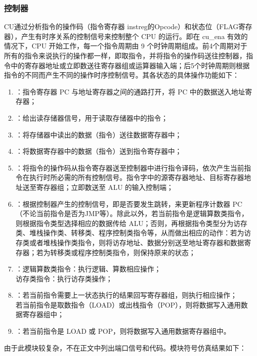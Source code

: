 \documentclass[titlepage, 11pt]{article}
\begin{document}
		\subsubsection{控制器}
		CU通过分析指令的操作码（指令寄存器 instreg的Opcode）和状态位（FLAG寄存器），产生有时序关系的控制信号来控制整个 CPU 的运行。即在 cu\_ena 有效的情况下，CPU 开始工作，每一个指令周期由 9 个时钟周期组成。前4个周期对于所有的指令来说执行的操作都一样，即取指令，并将指令的操作码送往控制器，指令中的寄存器地址或立即数送往寄存器组或运算器输入端；后5个时钟周期则根据指令的不同而产生不同的操作时序控制信号。其各状态的具体操作功能如下：
			\begin{enumerate}[状态1]
				\item：指令寄存器 PC 与地址寄存器之间的通路打开，将 PC 中的数据送入地址寄存器；
				\item：给出读存储器信号，用于读取存储器中的指令；
				\item：将存储器中读出的数据（指令）送往数据寄存器中；
				\item：将数据寄存器中的数据（指令）送到指令寄存器中；
				\item：将指令的操作码从指令寄存器送至控制器中进行指令译码，依次产生当前指令在执行时所必需的所有控制信号。指令字中的源寄存器地址、目标寄存器地址送至寄存器组；立即数送至 ALU 的输入控制端；
				\item：根据控制器产生的控制信号，即是否要发生跳转，来更新程序计数器 PC（不论当前指令是否为JMP等）。除此以外，若当前指令是逻辑算数类指令，则根据指令类型选择相应的数据传给 ALU；否则，再根据指令类型分为访存类、堆栈操作类、转移类、程序控制类指令等，从而做出相应的动作：若为访存类或者堆栈操作类指令，则将访存地址、数据分别送至地址寄存器和数据寄存器；若为转移类或程序控制类指令，则保持原来的状态；
				\item：逻辑算数类指令：执行逻辑、算数相应操作；\\
				访存类指令：执行访存类操作；
				\item：若当前指令需要上一状态执行的结果回写寄存器组，则执行相应操作；
				\\
				若当前指令是取数指令（LOAD）或出栈指令（POP），则将数据写入通用数据寄存器组中；
				\item：若当前指令是 LOAD 或 POP，则将数据写入通用数据寄存器组中。
			\end{enumerate}\par 
		    由于此模块较复杂，不在正文中列出端口信号和代码。模块符号仿真结果如下：
\end{document}
